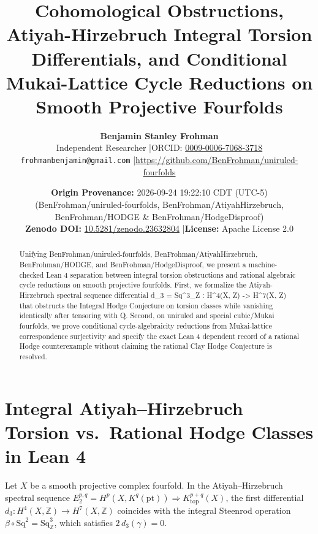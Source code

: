 \documentclass[11pt,letterpaper]{article}
\title{\textbf{Cohomological Obstructions, Atiyah-Hirzebruch Integral Torsion Differentials, and Conditional Mukai-Lattice Cycle Reductions on Smooth Projective Fourfolds}}
\author{\textbf{Benjamin Stanley Frohman}\\
Independent Researcher \quad|\quad ORCID: \href{https://orcid.org/0009-0006-7068-3718}{0009-0006-7068-3718}\\
\texttt{frohmanbenjamin@gmail.com} \quad|\quad \url{https://github.com/BenFrohman/uniruled-fourfolds}}
\date{\textbf{Origin Provenance:} 2026-09-24 19:22:10 CDT (UTC-5) (BenFrohman/uniruled-fourfolds, BenFrohman/AtiyahHirzebruch, BenFrohman/HODGE \& BenFrohman/HodgeDisproof)\\
\textbf{Zenodo DOI:} \href{https://doi.org/10.5281/zenodo.23632804}{10.5281/zenodo.23632804} \quad|\quad \textbf{License:} Apache License 2.0}
\begin{document}
\maketitle

\begin{center}
\end{center}

\begin{abstract}
\noindent Unifying BenFrohman/uniruled-fourfolds, BenFrohman/AtiyahHirzebruch, BenFrohman/HODGE, and BenFrohman/HodgeDisproof, we present a machine-checked Lean 4 separation between integral torsion obstructions and rational algebraic cycle reductions on smooth projective fourfolds. First, we formalize the Atiyah-Hirzebruch spectral sequence differential d\_3 = Sq\textasciicircum{}3\_Z : H\textasciicircum{}4(X, Z) -> H\textasciicircum{}7(X, Z) that obstructs the Integral Hodge Conjecture on torsion classes while vanishing identically after tensoring with Q. Second, on uniruled and special cubic/Mukai fourfolds, we prove conditional cycle-algebraicity reductions from Mukai-lattice correspondence surjectivity and specify the exact Lean 4 dependent record of a rational Hodge counterexample without claiming the rational Clay Hodge Conjecture is resolved.
\end{abstract}


\section{Integral Atiyah--Hirzebruch Torsion vs.\ Rational Hodge Classes in Lean 4}
Let $X$ be a smooth projective complex fourfold. In the Atiyah--Hirzebruch spectral sequence $E_2^{p,q} = H^p(X, K^q(\mathrm{pt})) \Rightarrow K^{p+q}_{\mathrm{top}}(X)$, the first differential $d_3 : H^4(X,\mathbb{Z}) \to H^7(X,\mathbb{Z})$ coincides with the integral Steenrod operation $\beta \circ \mathrm{Sq}^2 = \mathrm{Sq}^3_{\mathbb{Z}}$, which satisfies $2\,d_3(\gamma) = 0$.
\end{document}
